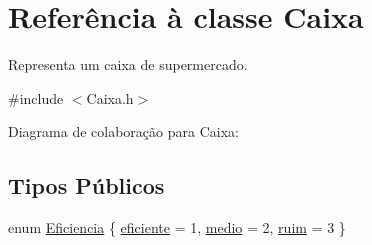 \hypertarget{a00001}{\section{Referência à classe Caixa}
\label{a00001}
}


Representa um caixa de supermercado.  




{\ttfamily \#include $<$Caixa.\+h$>$}



Diagrama de colaboração para Caixa\+:
\subsection*{Tipos Públicos}
\begin{DoxyCompactItemize}
\item 
enum \hyperlink{a00001_a0e98d0cd8dc2ff4f73d637d73f7bbe85}{Eficiencia} \{ \hyperlink{a00001_a0e98d0cd8dc2ff4f73d637d73f7bbe85ac540cf6ebf89599c2551d4b9b03c48d7}{eficiente} = 1, 
\hyperlink{a00001_a0e98d0cd8dc2ff4f73d637d73f7bbe85a44121dbf9c403365d0a090127e43a499}{medio} = 2, 
\hyperlink{a00001_a0e98d0cd8dc2ff4f73d637d73f7bbe85ad22f3ab5e25a4b9e6c8f534a88a04c7a}{ruim} = 3
 \}
\end{DoxyCompactItemize}
